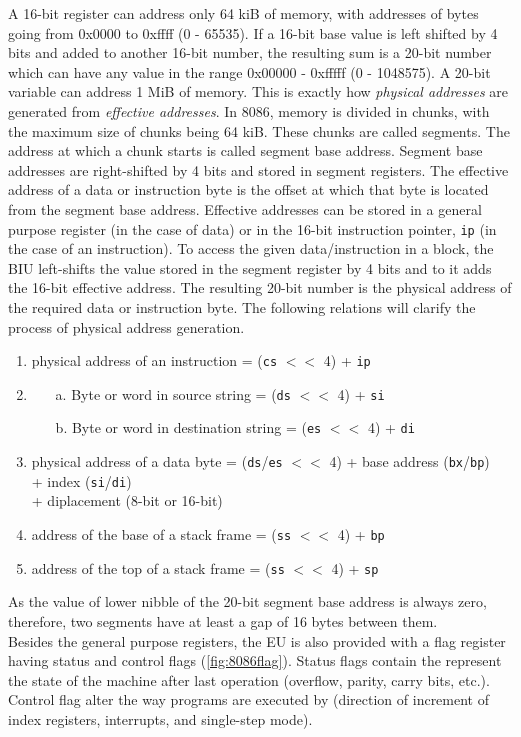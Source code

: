 A 16-bit register can address only 64 kiB of memory, with addresses of bytes going from 0x0000 to 0xffff (0 - 65535). If a 16-bit base value is left shifted by 4 bits and added to another 16-bit number, the resulting sum is a 20-bit number which can have any value in the range 0x00000 - 0xfffff (0 - 1048575). A 20-bit variable can address 1 MiB of memory. This is exactly how \textit{physical addresses} are generated from \textit{effective addresses}. In 8086, memory is divided in chunks, with the maximum size of chunks being 64 kiB. These chunks are called segments. The address at which a chunk starts is called segment base address. Segment base addresses are right-shifted by 4 bits and stored in segment registers. The effective address of a data or instruction byte is the offset at which that byte is located from the segment base address. Effective addresses can be stored in a general purpose register (in the case of data) or in the 16-bit instruction pointer, \verb|ip| (in the case of an instruction). To access the given data/instruction in a block, the BIU left-shifts the value stored in the segment register by 4 bits and to it adds the 16-bit effective address. The resulting 20-bit number is the physical address of the required data or instruction byte. The following relations will clarify the process of physical address generation.
\begin{enumerate}
  \item physical address of an instruction = (\verb|cs| $<<$ 4) + \verb|ip|
  \item \begin{enumerate}
    \item[a.] Byte or word in source string = (\texttt{ds} $<<$ 4) + \texttt{si}
    \item[b.] Byte or word in destination string =  (\texttt{es} $<<$ 4) + \texttt{di}
  \end{enumerate}
  \item physical address of a data byte = (\verb|ds|/\verb|es| $<<$ 4) + base address (\verb|bx|/\verb|bp|)\\
  \hspace*{8.7cm} + index (\verb|si|/\verb|di|)\\ 
  \hspace*{8.7cm} + diplacement (8-bit or 16-bit)
  \item address of the base of a stack frame = (\verb|ss| $<<$ 4) + \verb|bp|
  \item address of the top of a stack frame = (\verb|ss| $<<$ 4) + \verb|sp|
\end{enumerate}
As the value of lower nibble of the 20-bit segment base address is always zero, therefore, two segments have at least a gap of 16 bytes between them.\\
Besides the general purpose registers, the EU is also provided with a flag register having status and control flags (\autoref{fig:8086flag}). Status flags contain the represent the state of the machine after last operation (overflow, parity, carry bits, etc.). Control flag alter the way programs are executed by (direction of increment of index registers, interrupts, and single-step mode).

